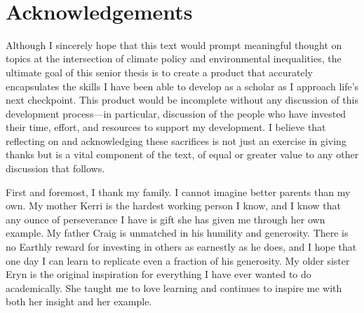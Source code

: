~
\newpage
\section*{Acknowledgements}

Although I sincerely hope that this text would prompt meaningful thought on topics at the intersection of climate policy and environmental inequalities, the ultimate goal of this senior thesis is to create a product that accurately encapsulates the skills I have been able to develop as a scholar as I approach life's next checkpoint. This product would be incomplete without any discussion of this development process---in particular, discussion of the people who have invested their time, effort, and resources to support my development. I believe that reflecting on and acknowledging these sacrifices is not just an exercise in giving thanks but is a vital component of the text, of equal or greater value to any other discussion that follows. 

First and foremost, I thank my family. I cannot imagine better parents than my own. My mother Kerri is the hardest working person I know, and 
I know that any ounce of perseverance I have is gift she has given me through her own example. My father Craig is unmatched in his humility and generosity. There is no Earthly reward for investing in others as earnestly as he does, and I hope that one day I can learn to replicate even a fraction of his generosity. My older sister Eryn is the original inspiration for everything I have ever wanted to do academically. She taught me to love learning and continues to inspire me with both her insight and her example.  

